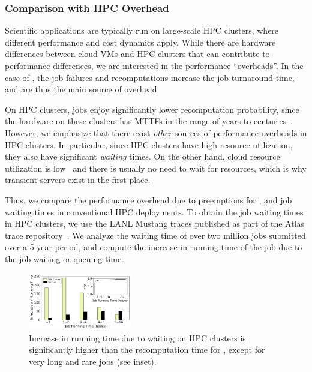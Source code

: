 \subsubsection{Comparison with HPC Overhead}

Scientific applications are typically run on large-scale HPC clusters, where different performance and cost dynamics apply.
While there are hardware differences between cloud VMs and HPC clusters that can contribute to performance differences, we are interested in the performance ``overheads''.
In the case of \sysname, the job failures and recomputations increase the job turnaround time, and are thus the main source of overhead.

On HPC clusters, jobs enjoy significantly lower recomputation probability, since the hardware on these clusters has MTTFs in the range of years to centuries~\cite{dongarra_fault_nodate}.
However, we emphasize that there exist \emph{other} sources of performance overheads in HPC clusters.
In particular, since HPC clusters have high resource utilization, they also have significant \emph{waiting} times. 
On the other hand, cloud resource utilization is low~\cite{borg} and there is usually no need to wait for resources, which is why transient servers exist in the first place. 


Thus, we compare the performance overhead due to preemptions for \sysname, and job waiting times in conventional HPC deployments.
To obtain the job waiting times in HPC clusters, we use the LANL Mustang traces published as part of the Atlas trace repository~\cite{cmu-atlas}.
We analyze the waiting time of over two million jobs submitted over a 5 year period, and compute the increase in running time of the job due to the job waiting or queuing time. 

\begin{figure}[t]
  \centering 
  \includegraphics[width=0.4\textwidth]{../graphs/hpc-vs-scispot.pdf}
      \vspace*{\myfigspace}
  \caption{Increase in running time due to waiting on HPC clusters is significantly higher than the recomputation time for \sysname, except for very long and rare jobs (see inset). }
  \label{fig:hpc-vs-scispot}
  \vspace*{\myfigspace}
\end{figure}



